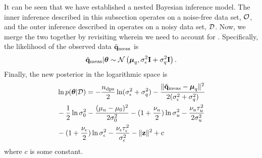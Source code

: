 It can be seen that we have established a nested Bayesian inference model. The inner inference described in this subsection operates on a noise-free data set, $\mathcal{O}$, and the outer inference described in  operates on a noisy data set, $\mathcal{D}$. Now, we merge the two together by revisiting  wherein we need to account for . Specifically, the likelihood of the observed data $\tilde{\mathbf{q}}_{\text{meas}}$ is
\begin{equation} \elabel{noise-approximation-model}
  \mvT_\meas | \vparam \sim \gaussian{\vMean_\T}{\sigma_\noise^2 \mI + \sigma_\T^2 \mI}.
\end{equation}
Finally, the new posterior in the logarithmic space is
\begin{align}
  & \ln \f{\vparam | \Data} = -\frac{\ndcs}{2} \ln(\sigma^2_\noise + \sigma^2_\T) - \frac{\norm{\mvT_\meas - \vMean_\T}^2}{2(\sigma^2_\noise + \sigma^2_\T)} \nonumber \\
  & {} - \frac{1}{2} \ln \sigma^2_0 - \frac{(\mu_\u - \mu_0)^2}{2 \sigma^2_0} - (1 + \frac{\nu_\u}{2}) \ln \sigma^2_\u - \frac{\nu_\u \tau_\u^2}{2 \sigma^2_\u} \nonumber \\
  & {} - (1 + \frac{\nu_\noise}{2}) \ln \sigma^2_\noise - \frac{\nu_\noise \tau_\noise^2}{\sigma^2_\noise} - \norm{\vz}^2 + c \elabel{log-posterior}
\end{align}
where $c$ is some constant.
